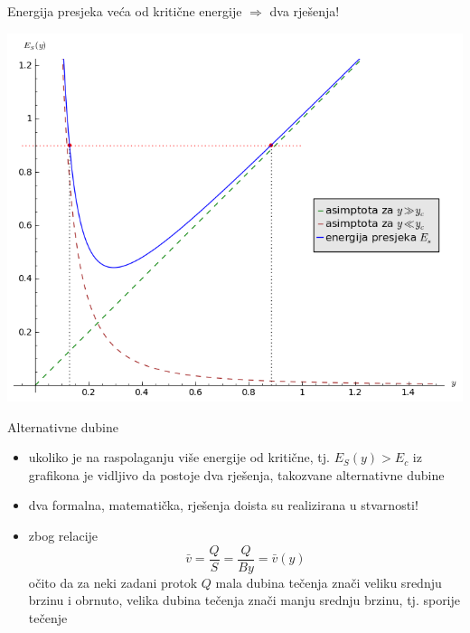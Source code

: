 \documentclass[croatian]{beamer}
\begin{document}
\begin{frame}{Energija presjeka veća od kritične energije $\Rightarrow$ dva rješenja!}

\begin{center}
\includegraphics[height=0.7\paperheight]{slike/MF-10-mirni-i-siloviti-tok}
\par\end{center}

\end{frame}

\begin{frame}{Alternativne dubine}

\begin{itemize}
\item ukoliko je na raspolaganju više energije od kritične, tj. $E_{S}(y)>E_{c}$
iz grafikona je vidljivo da postoje dva rješenja, takozvane \alert{alternativne dubine}
\item dva formalna, matematička, rješenja doista su realizirana u stvarnosti!
\item zbog relacije 
\[
\bar{v}=\frac{Q}{S}=\frac{Q}{By}=\bar{v}(y)
\]
očito da za neki zadani protok $Q$ mala dubina tečenja znači veliku
srednju brzinu i obrnuto, velika dubina tečenja znači manju srednju
brzinu, tj. sporije tečenje
\end{itemize}
\end{frame}
\end{document}
